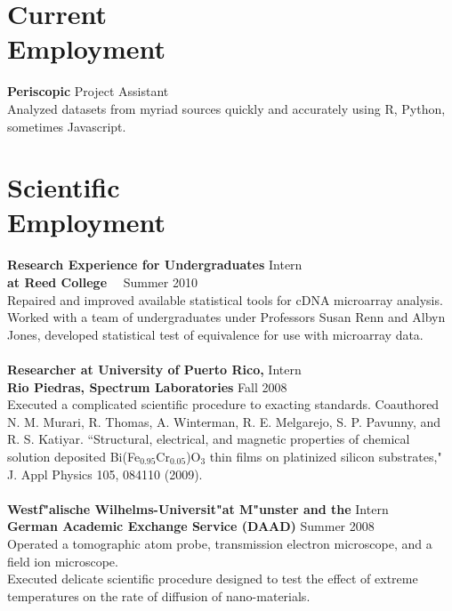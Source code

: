 \documentclass[margin,line]{resume}
\begin{document}
\begin{resume}
	\section{\mysidestyle Current\\Employment}
	\textbf{Periscopic} \hfill Project Assistant \\
	Analyzed datasets from myriad sources quickly and accurately using R, Python, sometimes Javascript.
    \section{\mysidestyle Scientific\\Employment} 
\textbf{Research Experience for Undergraduates} \hfill  Intern \\ 
\textbf{at Reed College} \ \  \hfill Summer 2010 \\
Repaired and improved available statistical tools for cDNA microarray analysis. Worked with a team of undergraduates under Professors Susan Renn and Albyn Jones, developed statistical test of equivalence for use with microarray data. \\
\vspace{-2mm} \\
\textbf{Researcher at University of Puerto Rico,} \hfill  Intern\\
\textbf{Rio Piedras, Spectrum Laboratories} \hfill Fall 2008	\\
Executed a complicated scientific procedure to exacting standards. Coauthored N. M. Murari, R. Thomas, A. Winterman, R. E. Melgarejo, S. P. Pavunny, and R. S. Katiyar. ``Structural, electrical, and magnetic properties of chemical solution deposited Bi(Fe$_{0.95}$Cr$_{0.05}$)O$_3$ thin films on platinized silicon substrates," J. Appl Physics 105, 084110 (2009). 
\\\vspace{-2mm}\\
\textbf{Westf"alische Wilhelms-Universit"at M"unster and the} \hfill  Intern \\
\textbf{German Academic Exchange Service (DAAD)} \hfill Summer 2008	\\
Operated a tomographic atom probe, transmission electron microscope, and a field ion microscope. \\ Executed delicate scientific procedure designed to test the effect of extreme temperatures on the rate of diffusion of nano-materials.


\end{resume}
\end{document}
